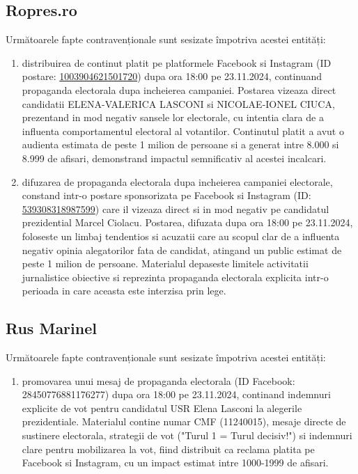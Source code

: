 \documentclass[a4paper,12pt]{article}
\begin{document}
\vspace{0.5cm}

\subsection{Ropres.ro}
Următoarele fapte contravenționale sunt sesizate împotriva acestei entități:

\begin{enumerate}[leftmargin=*, label=\arabic*.)]
    \item distribuirea de continut platit pe platformele Facebook si Instagram (ID postare: \href{https://www.facebook.com/ads/library/?id=1003904621501720}{1003904621501720}) dupa ora 18:00 pe 23.11.2024, continuand propaganda electorala dupa incheierea campaniei. Postarea vizeaza direct candidatii ELENA-VALERICA LASCONI si NICOLAE-IONEL CIUCA, prezentand in mod negativ sansele lor electorale, cu intentia clara de a influenta comportamentul electoral al votantilor. Continutul platit a avut o audienta estimata de peste 1 milion de persoane si a generat intre 8.000 si 8.999 de afisari, demonstrand impactul semnificativ al acestei incalcari.
    \item difuzarea de propaganda electorala dupa incheierea campaniei electorale, constand intr-o postare sponsorizata pe Facebook si Instagram (ID: \href{https://www.facebook.com/ads/library/?id=539308318987599}{539308318987599}) care il vizeaza direct si in mod negativ pe candidatul prezidential Marcel Ciolacu. Postarea, difuzata dupa ora 18:00 pe 23.11.2024, foloseste un limbaj tendentios si acuzatii care au scopul clar de a influenta negativ opinia alegatorilor fata de candidat, atingand un public estimat de peste 1 milion de persoane. Materialul depaseste limitele activitatii jurnalistice obiective si reprezinta propaganda electorala explicita intr-o perioada in care aceasta este interzisa prin lege.
\end{enumerate}

\vspace{0.5cm}

\subsection{Rus Marinel}
Următoarele fapte contravenționale sunt sesizate împotriva acestei entități:

\begin{enumerate}[leftmargin=*, label=\arabic*.)]
    \item promovarea unui mesaj de propaganda electorala (ID Facebook: 28450776881176277) dupa ora 18:00 pe 23.11.2024, continand indemnuri explicite de vot pentru candidatul USR Elena Lasconi la alegerile prezidentiale. Materialul contine numar CMF (11240015), mesaje directe de sustinere electorala, strategii de vot ("Turul 1 = Turul decisiv!") si indemnuri clare pentru mobilizarea la vot, fiind distribuit ca reclama platita pe Facebook si Instagram, cu un impact estimat intre 1000-1999 de afisari.
\end{enumerate}
\end{document}
